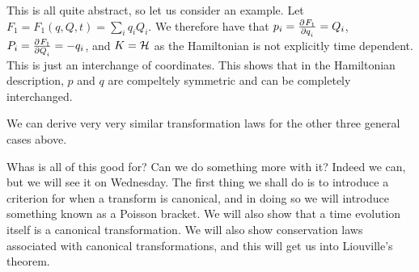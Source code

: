 \noindent This is all quite abstract, so let us consider an example. Let $F_1 = F_1(q, Q, t) = \sum_i q_iQ_i$. We therefore have that $p_i = \pd{F_1}{q_i} = Q_i$, $P_i = \pd{F_1}{Q_i} = - q_i$, and $K = \mathcal{H}$ as the Hamiltonian is not explicitly time dependent. This is just an interchange of coordinates. This shows that in the Hamiltonian description, $p$ and $q$ are compeltely symmetric and can be completely interchanged. 

\noindent We can derive very very similar transformation laws for the other three general cases above.

\noindent Whas is all of this good for? Can we do something more with it? Indeed we can, but we will see it on Wednesday. The first thing we shall do is to introduce a criterion for when a transform is canonical, and in doing so we will introduce something known as a Poisson bracket. We will also show that a time evolution itself is a canonical transformation. We will also show conservation laws associated with canonical transformations, and this will get us into Liouville's theorem. 
